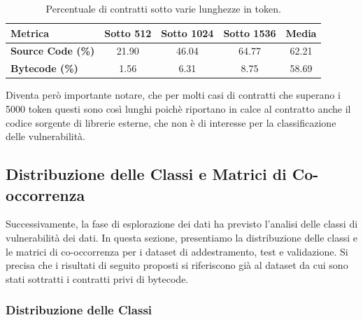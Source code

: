 \documentclass[../../Thesis.tex]{subfiles}
\begin{document}
\begin{table}[h!]
    \centering
    \begin{tabular}{|l|c|c|c|c|}
        \hline
        \textbf{Metrica} & \textbf{Sotto 512} & \textbf{Sotto 1024} & \textbf{Sotto 1536} & \textbf{Media} \\
        \hline
        \textbf{Source Code (\%)} & 21.90 & 46.04 & 64.77 & 62.21 \\
        \textbf{Bytecode (\%)} & 1.56 & 6.31 & 8.75 & 58.69 \\
        \hline
    \end{tabular}
    \caption{Percentuale di contratti sotto varie lunghezze in token.}
    \label{tab:summary}
\end{table}


Diventa però importante notare, che per molti casi di contratti che superano i 5000 token questi sono così lunghi poichè riportano in calce al contratto anche il codice sorgente di librerie esterne, che non è di interesse per la classificazione delle vulnerabilità. 


\subsection{Distribuzione delle Classi e Matrici di Co-occorrenza}
Successivamente, la fase di esplorazione dei dati ha previsto l'analisi delle classi di vulnerabilità dei dati. In questa sezione, presentiamo la distribuzione delle classi e le matrici di co-occorrenza per i dataset di addestramento, test e validazione. Si precisa che i risultati di seguito proposti si riferiscono già al dataset da cui sono stati sottratti i contratti privi di bytecode.

\subsubsection{Distribuzione delle Classi}
\end{document}
